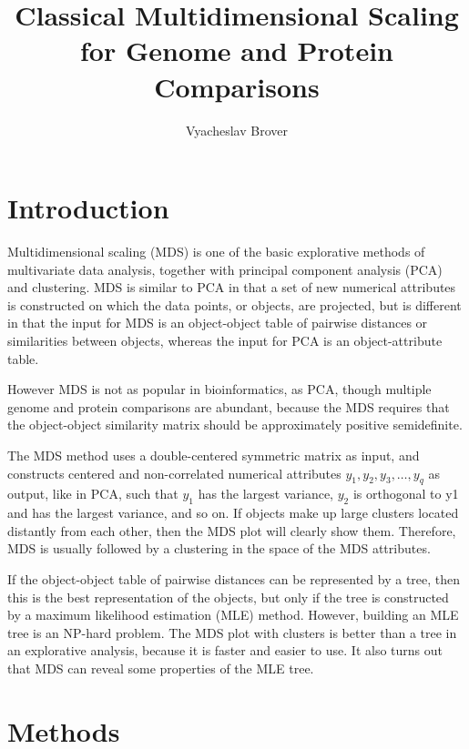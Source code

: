 \documentclass[10pt,a4paper]{article}
\title{Classical Multidimensional Scaling for Genome and Protein Comparisons}
\author{Vyacheslav Brover}
\begin{document}
\maketitle

\tableofcontents

\large


\section{Introduction}

Multidimensional scaling (MDS) is one of the basic explorative methods of multivariate data analysis, together with principal component analysis (PCA) and clustering.
MDS is similar to PCA in that a set of new numerical attributes is constructed on which the data points, or objects, are projected,
but is different in that the input for MDS is an object-object table of pairwise distances or similarities between objects,
whereas the input for PCA is an object-attribute table.

However MDS is not as popular in bioinformatics, as PCA, though multiple genome and protein comparisons are abundant,
because the MDS requires that the object-object similarity matrix should be approximately positive semidefinite.

The MDS method uses a double-centered symmetric matrix as input, and constructs centered and non-correlated numerical attributes $y_1, y_2, y_3, \dots, y_q$ as output,
like in PCA, such that $y_1$ has the largest variance, $y_2$ is orthogonal to y1 and has the largest variance, and so on.
If objects make up large clusters located distantly from each other, then the MDS plot will clearly show them.
Therefore, MDS is usually followed by a clustering in the space of the MDS attributes.

If the object-object table of pairwise distances can be represented by a tree, then this is the best representation of the objects,
but only if the tree is constructed by a maximum likelihood estimation (MLE) method.
However, building an MLE tree is an NP-hard problem.
The MDS plot with clusters is better than a tree in an explorative analysis, because it is faster and easier to use.
It also turns out that MDS can reveal some properties of the MLE tree.




\section{Methods}
\end{document}
